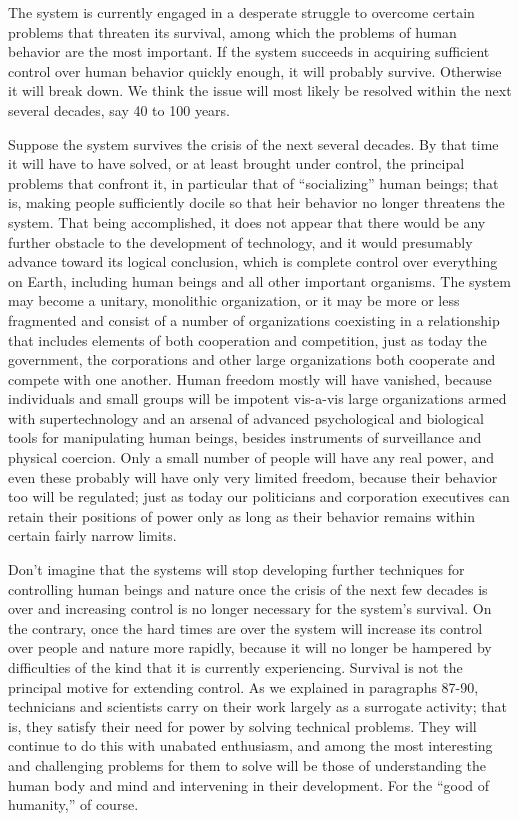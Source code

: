 The system is currently engaged in a desperate struggle to overcome certain problems that threaten its survival, among which the problems of human behavior are the most important. If the system succeeds in acquiring sufficient control over human behavior quickly enough, it will probably survive. Otherwise it will break down. We think the issue will most likely be resolved within the next several decades, say 40 to 100 years.

 Suppose the system survives the crisis of the next several decades. By that time it will have to have solved, or at least brought under control, the principal problems that confront it, in particular that of “socializing” human beings; that is, making people sufficiently docile so that heir behavior no longer threatens the system. That being accomplished, it does not appear that there would be any further obstacle to the development of technology, and it would presumably advance toward its logical conclusion, which is complete control over everything on Earth, including human beings and all other important organisms. The system may become a unitary, monolithic organization, or it may be more or less fragmented and consist of a number of organizations coexisting in a relationship that includes elements of both cooperation and competition, just as today the government, the corporations and other large organizations both cooperate and compete with one another. Human freedom mostly will have vanished, because individuals and small groups will be impotent vis-a-vis large organizations armed with supertechnology and an arsenal of advanced psychological and biological tools for manipulating human beings, besides instruments of surveillance and physical coercion. Only a small number of people will have any real power, and even these probably will have only very limited freedom, because their behavior too will be regulated; just as today our politicians and corporation executives can retain their positions of power only as long as their behavior remains within certain fairly narrow limits.

 Don’t imagine that the systems will stop developing further techniques for controlling human beings and nature once the crisis of the next few decades is over and increasing control is no longer necessary for the system’s survival. On the contrary, once the hard times are over the system will increase its control over people and nature more rapidly, because it will no longer be hampered by difficulties of the kind that it is currently experiencing. Survival is not the principal motive for extending control. As we explained in paragraphs 87-90, technicians and scientists carry on their work largely as a surrogate activity; that is, they satisfy their need for power by solving technical problems. They will continue to do this with unabated enthusiasm, and among the most interesting and challenging problems for them to solve will be those of understanding the human body and mind and intervening in their development. For the “good of humanity,” of course.

